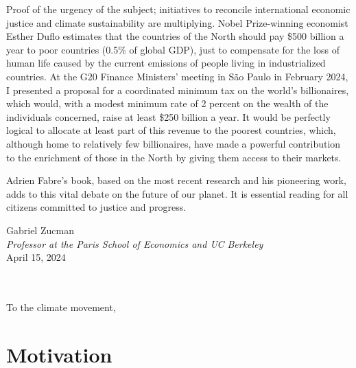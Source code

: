 \documentclass[a5paper,english,openany]{memoir}
\begin{document}
Proof of the urgency of the subject; %
initiatives to reconcile international economic justice and climate sustainability are multiplying. Nobel Prize-winning economist Esther Duflo estimates that the countries of the North should pay \$500 billion a year to poor countries (0.5\% of global GDP), just to compensate for the loss of human life caused by the current emissions of people living in industrialized %
countries. At the G20 Finance Ministers' meeting in São Paulo in February 2024, I presented a proposal for a coordinated minimum tax on the world's billionaires, which would, with a modest minimum rate of 2 percent on the wealth of the individuals concerned, raise at least \$250 billion a year. It would be perfectly logical to allocate at least part of this revenue to the poorest countries, which, although home to relatively few billionaires, have made a powerful contribution to the enrichment of those in the North by giving them access to their markets. 

Adrien Fabre's book, based on the most recent research and his pioneering work, adds to this vital debate on the future of our planet. It is essential reading for all citizens committed to justice and progress.

\begin{flushright}
Gabriel Zucman\\
\textit{Professor at the Paris School of Economics and UC Berkeley}\\
April 15, 2024

\clearpage
\quad \\ ~\vspace{2cm} \\
{\raggedleft To the climate movement,}
\end{flushright}
\clearpage


\chapter*{Motivation}{\label{ch:intro}}
\end{document}
